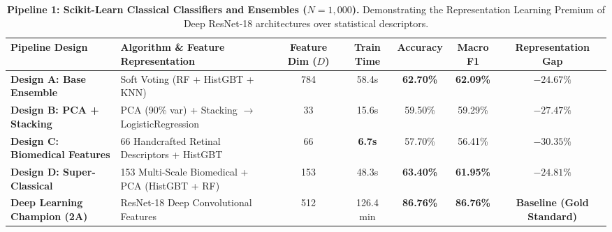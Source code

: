 \documentclass{article}
\begin{document}
\begin{table}[t]
\centering
\small
\caption{\textbf{Pipeline 1: Scikit-Learn Classical Classifiers and Ensembles ($N = 1,000$).} Demonstrating the Representation Learning Premium of Deep ResNet-18 architectures over statistical descriptors.}
\label{tab:classical_ml}
\begin{tabular}{llccccc}
\toprule
\textbf{Pipeline Design} & \textbf{Algorithm \& Feature Representation} & \textbf{Feature Dim ($D$)} & \textbf{Train Time} & \textbf{Accuracy} & \textbf{Macro F1} & \textbf{Representation Gap} \\
\midrule
\textbf{Design A: Base Ensemble} & Soft Voting (RF + HistGBT + KNN) & 784 & 58.4s & \textbf{62.70\%} & \textbf{62.09\%} & $-24.67\%$ \\
\textbf{Design B: PCA + Stacking} & PCA (90\% var) + Stacking $\to$ LogisticRegression & 33 & 15.6s & 59.50\% & 59.29\% & $-27.47\%$ \\
\textbf{Design C: Biomedical Features} & 66 Handcrafted Retinal Descriptors + HistGBT & 66 & \textbf{6.7s} & 57.70\% & 56.41\% & $-30.35\%$ \\
\textbf{Design D: Super-Classical} & 153 Multi-Scale Biomedical + PCA (HistGBT + RF) & 153 & 48.3s & \textbf{63.40\%} & \textbf{61.95\%} & $-24.81\%$ \\
\midrule
\textbf{Deep Learning Champion (2A)} & ResNet-18 Deep Convolutional Features & 512 & 126.4 min & \textbf{86.76\%} & \textbf{86.76\%} & \textbf{Baseline (Gold Standard)} \\
\bottomrule
\end{tabular}
\end{table}
\end{document}

